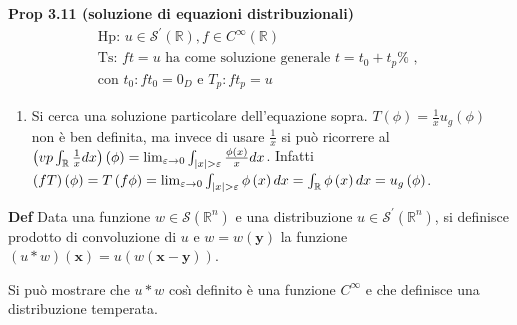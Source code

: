 \documentclass{article}
\begin{document}
\textbf{Prop 3.11 (soluzione di equazioni distribuzionali)}%
\begin{gather*}
\text{Hp}\text{: }u\in \mathcal{S}^{\prime }\left( 
\mathbb{R}
\right) ,f\in C^{\infty }\left( 
\mathbb{R}
\right) \\
\text{Ts}\text{: }ft=u\text{ ha come soluzione generale }t=t_{0}+t_{p}\text{%
, } \\
\text{con }t_{0}:ft_{0}=0_{D}\text{ e }T_{p}:ft_{p}=u
\end{gather*}

\begin{enumerate}
\item Si cerca una soluzione particolare dell'equazione sopra. $T\left( \phi
\right) =\frac{1}{x}u_{g}\left( \phi \right) $ non \`{e} ben definita, ma
invece di usare $\frac{1}{x}$ si pu\`{o} ricorrere al $\left( vp\int_{%
\mathbb{R}
}\frac{1}{x}dx\right) \left( \phi \right) =\lim_{\varepsilon \rightarrow
0}\int_{\left\vert x\right\vert >\varepsilon }\frac{\phi \left( x\right) }{x}%
dx$. Infatti $\left( fT\right) \left( \phi \right) =T\left( f\phi \right)
=\lim_{\varepsilon \rightarrow 0}\int_{\left\vert x\right\vert >\varepsilon
}\phi \left( x\right) dx=\int_{%
\mathbb{R}
}\phi \left( x\right) dx=u_{g}\left( \phi \right) $.
\end{enumerate}

\textbf{Def} Data una funzione $w\in \mathcal{S}\left( 
\mathbb{R}
^{n}\right) $ e una distribuzione $u\in \mathcal{S}^{\prime }\left( 
\mathbb{R}
^{n}\right) $, si definisce prodotto di convoluzione di $u$ e $w=w\left( 
\mathbf{y}\right) $ la funzione $\left( u\ast w\right) \left( \mathbf{x}%
\right) =u\left( w\left( \mathbf{x-y}\right) \right) $.

Si pu\`{o} mostrare che $u\ast w$ cos\`{\i} definito \`{e} una funzione $%
C^{\infty }$ e che definisce una distribuzione temperata.
\end{document}
